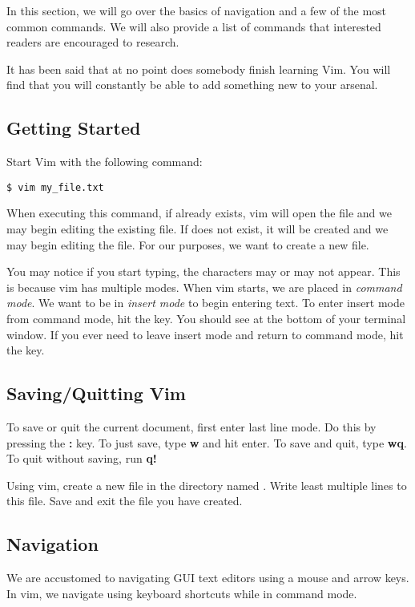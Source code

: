 In this section, we will go over the basics of navigation and a few of the most common commands. We will also provide a list of commands that interested readers are encouraged to research. 

It has been said that at no point does somebody finish learning Vim. You will find that you will constantly be able to add something new to your arsenal.

\subsection*{Getting Started}

Start Vim with the following command:

\begin{lstlisting}
$ vim my_file.txt
\end{lstlisting}

When executing this command, if  already exists, vim will open the file and we may begin editing the existing file.
If  does not exist, it will be created and we may begin editing the file.
For our purposes, we want to create a new file.

You may notice if you start typing, the characters may or may not appear.
This is because vim has multiple modes.
When vim starts, we are placed in \emph{command mode}.
We want to be in \emph{insert mode} to begin entering text.
To enter insert mode from command mode, hit the  key.
You should see  at the bottom of your terminal window.
If you ever need to leave insert mode and return to command mode, hit the  key.

\subsection*{Saving/Quitting Vim}
To save or quit the current document, first enter last line mode.
Do this by pressing the \textbf{:} key.
To just save, type \textbf{w} and hit enter.
To save and quit, type \textbf{wq}.
To quit without saving, run \textbf{q!}

\begin{problem}
Using vim, create a new file in the  directory named .
Write least multiple lines to this file.
Save and exit the file you have created.
\end{problem}

\subsection*{Navigation}
We are accustomed to navigating GUI text editors using a mouse and arrow keys. In vim, we navigate using keyboard shortcuts while in command mode.

